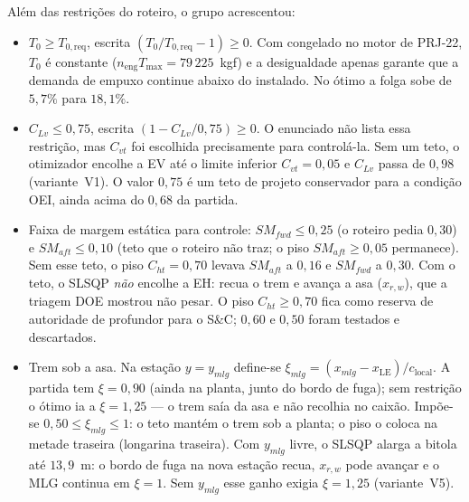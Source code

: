 Além das restrições do roteiro, o grupo acrescentou:
\begin{itemize}
\item $T_0 \ge T_{0,\mathrm{req}}$, escrita
      $(T_0/T_{0,\mathrm{req}}-1)\ge 0$. Com  congelado no motor
      de PRJ-22, $T_0$ é constante
      ($n_{\mathrm{eng}}T_{\max}=79\,225$~kgf) e a desigualdade apenas
      garante que a demanda de empuxo continue abaixo do instalado. No
      ótimo a folga sobe de $5{,}7\%$ para $18{,}1\%$.
\item $C_{Lv}\le 0{,}75$, escrita $(1-C_{Lv}/0{,}75)\ge 0$. O enunciado
      não lista essa restrição, mas $C_{vt}$ foi escolhida
      precisamente para controlá-la. Sem um teto, o otimizador encolhe a
      EV até o limite inferior $C_{vt}=0{,}05$ e $C_{Lv}$ passa de $0{,}98$
      (variante~V1). O valor $0{,}75$ é um teto de projeto conservador
      para a condição OEI, ainda acima do $0{,}68$ da partida.
\item Faixa de margem estática para controle:
      $SM_{fwd}\le 0{,}25$ (o roteiro pedia $0{,}30$) e
      $SM_{aft}\le 0{,}10$ (teto que o roteiro não traz; o piso
      $SM_{aft}\ge 0{,}05$ permanece). Sem esse teto, o piso
      $C_{ht}=0{,}70$ levava $SM_{aft}$ a $0{,}16$ e $SM_{fwd}$ a $0{,}30$.
      Com o teto, o SLSQP \emph{não} encolhe a EH: recua o trem e avança
      a asa ($x_{r,w}$), que a triagem DOE mostrou não pesar. O piso
      $C_{ht}\ge 0{,}70$ fica como reserva de autoridade de profundor para
      o S\&C; $0{,}60$ e $0{,}50$ foram testados e descartados.
\item Trem sob a asa. Na estação $y=y_{mlg}$ define-se
      $\xi_{mlg}=(x_{mlg}-x_{\mathrm{LE}})/c_{\mathrm{local}}$.
      A partida tem $\xi=0{,}90$ (ainda na planta, junto do bordo de fuga);
      sem restrição o ótimo ia a $\xi=1{,}25$ --- o trem saía
      da asa e não recolhia no caixão. Impõe-se
      $0{,}50\le\xi_{mlg}\le 1$: o teto mantém o trem sob a planta; o
      piso o coloca na metade traseira (longarina traseira). Com $y_{mlg}$
      livre, o SLSQP alarga a bitola até $13{,}9$~m: o bordo de fuga na
      nova estação recua, $x_{r,w}$ pode avançar e o MLG continua
      em $\xi=1$. Sem $y_{mlg}$ esse ganho exigia $\xi=1{,}25$ (variante~V5).
\end{itemize}

